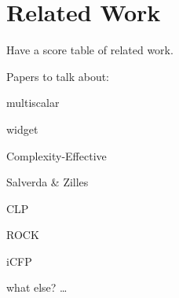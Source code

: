 \section{Related Work}
\label{sec:rel_work}

Have a score table of related work.

Papers to talk about:

\begin{list_type}
    \item multiscalar
    \item widget
    \item Complexity-Effective
    \item Salverda & Zilles
    \item CLP
    \item ROCK
    \item iCFP
    \item what else?
    \ldots
\end{list_type}
